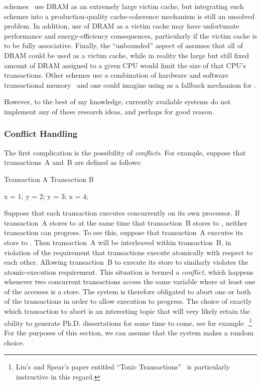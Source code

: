  schemes~\cite{CScottAnanian2006,KevinEMoore2006}
use DRAM as an extremely large victim cache, but integrating such schemes
into a production-quality cache-coherence mechanism is still an unsolved
problem.
In addition, use of DRAM as a victim cache may have unfortunate
performance and energy-efficiency consequences, particularly
if the victim cache is to be fully associative.
Finally, the ``unbounded'' aspect of  assumes that all of DRAM
could be used as a victim cache, while in reality
the large but still fixed amount of DRAM assigned to a given CPU
would limit the size of that CPU's transactions.
Other schemes use a combination of hardware and software transactional
memory~\cite{SanjeevKumar2006} and one could imagine using  as a
fallback mechanism for .

However, to the best of my knowledge, currently available systems do
not implement any of these research ideas, and perhaps for good reason.

\subsubsection{Conflict Handling}
\label{sec:future:Conflict Handling}

The first complication is the possibility of \emph{conflicts}.
For example, suppose that transactions~A and~B are defined as follows:

\begin{VerbatimU}
Transaction A       Transaction B

x = 1;              y = 2;
y = 3;              x = 4;
\end{VerbatimU}

Suppose that each transaction executes concurrently on its own processor.
If transaction~A stores to  at the same time that transaction~B
stores to , neither transaction can progress.
To see this, suppose that transaction~A executes its store to .
Then transaction~A will be interleaved within transaction~B, in violation
of the requirement that transactions execute atomically with respect to
each other.
Allowing transaction~B to execute its store to  similarly violates
the atomic-execution requirement.
This situation is termed a \emph{conflict}, which happens whenever two
concurrent transactions access the same variable where at least one of
the accesses is a store.
The system is therefore obligated to abort one or both of the transactions
in order to allow execution to progress.
The choice of exactly which transaction to abort is an interesting topic
that will very likely retain the ability to generate Ph.D. dissertations for
some time to come, see for
example~\cite{EgeAkpinar2011HTM2TLE}.\footnote{
	Liu's and Spear's paper entitled ``Toxic
	Transactions''~\cite{YujieLiu2011ToxicTransactions} is
	particularly instructive in this regard.}
For the purposes of this section, we can assume that the system makes
a random choice.

